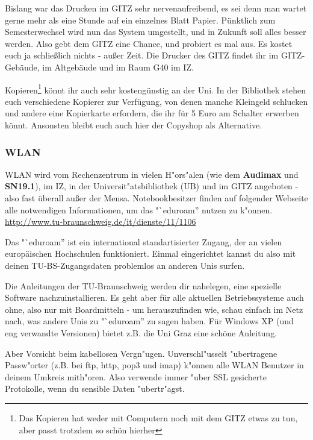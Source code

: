 Bislang war das Drucken im GITZ sehr nervenaufreibend, es sei denn man wartet gerne mehr als eine Stunde auf ein einzelnes Blatt Papier. Pünktlich zum Semesterwechsel wird nun das System umgestellt, und in Zukunft soll alles besser werden. Also gebt dem GITZ eine Chance, und probiert es mal aus. Es kostet euch ja schließlich nichts - außer Zeit. Die Drucker des GITZ findet ihr im GITZ-Gebäude, im Altgebäude und im Raum G40 im IZ.

Kopieren\footnote{Das Kopieren hat weder mit Computern noch mit dem GITZ etwas zu tun, aber passt trotzdem so schön hierher} könnt ihr auch sehr kostengünstig an der Uni. In der Bibliothek stehen euch verschiedene Kopierer zur Verfügung, von denen manche Kleingeld schlucken und andere eine Kopierkarte erfordern, die ihr für 5 Euro am Schalter erwerben könnt. Ansonsten bleibt euch auch hier der Copyshop als Alternative.

\subsubsection{WLAN}
\label{wlan}
WLAN wird vom Rechenzentrum in vielen H"ors"alen (wie dem \textbf{Audimax} und
\textbf{SN19.1}), im IZ, in der Universit"atsbibliothek (UB) und im GITZ angeboten - 
also fast überall außer der Mensa.
Notebookbesitzer finden auf folgender Webseite alle notwendigen Informationen, um 
das "`eduroam'' nutzen zu k"onnen.
\url{http://www.tu-braunschweig.de/it/dienste/11/1106}

Das "`eduroam'' ist ein international standartisierter Zugang, der an vielen 
europäischen Hochschulen funktioniert. Einmal eingerichtet kannst du also mit 
deinen TU-BS-Zugangsdaten problemlos an anderen Unis surfen.

Die Anleitungen der TU-Braunschweig werden dir nahelegen, eine spezielle Software 
nachzuinstallieren. Es geht aber für alle aktuellen Betriebssysteme auch ohne, also nur mit 
Boardmitteln - um herauszufinden wie, schau einfach im Netz nach, was andere 
Unis zu "`eduroam'' zu sagen haben. Für Windows XP (und eng verwandte Versionen) 
bietet z.B. die Uni Graz eine schöne Anleitung.

Aber Vorsicht beim kabellosen Vergn"ugen. Unverschl"usselt "ubertragene
Passw"orter (z.B. bei ftp, http, pop3 und imap) k"onnen alle WLAN
Benutzer in deinem Umkreis mith"oren. Also verwende immer "uber SSL
gesicherte Protokolle, wenn du sensible Daten "ubertr"agst.

